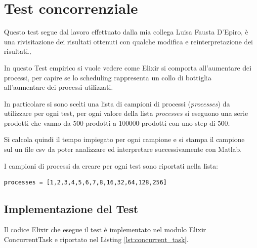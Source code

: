 \section{Test concorrenziale}\label{sec:test_concorrenziale}

Questo test segue dal lavoro effettuato dalla mia collega
Luisa Fausta D'Epiro, è una rivisitazione dei risultati
ottenuti con qualche modifica e reinterpretazione dei risultati.\cite{tesiLuisa}, 

In questo Test empirico si vuole vedere come Elixir
si comporta all'aumentare dei processi, per capire
se lo scheduling rappresenta un collo di bottiglia
all'aumentare dei processi utilizzati.

In particolare si sono scelti una lista di campioni
di processi (\textit{processes}) da utilizzare per ogni test,
per ogni valore della lista \textit{processes}
si eseguono una serie prodotti che vanno da 500 prodotti
a 100000 prodotti con uno step di 500.

Si calcola quindi il tempo impiegato per ogni campione
e si stampa il campione sul un file csv da poter analizzare
ed interpretare successivamente con Matlab.

I campioni di processi da creare per ogni test
sono riportati nella lista:
\begin{lstlisting}[language=none]
processes = [1,2,3,4,5,6,7,8,16,32,64,128,256]
\end{lstlisting}

\subsection{Implementazione del Test}

Il codice Elixir che esegue il test è
implementato nel modulo Elixir ConcurrentTask e
riportato nel Listing \ref{lst:concurrent_task}.


